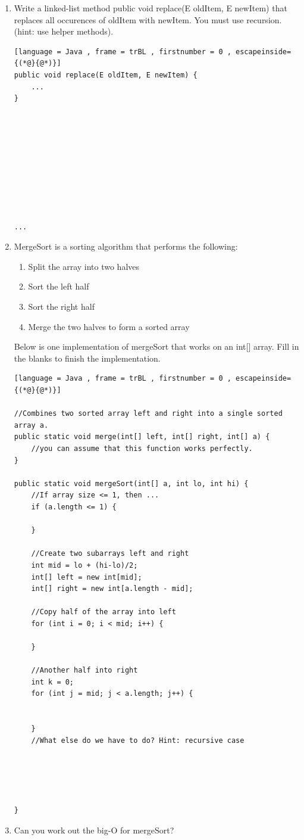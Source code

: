 \documentclass[letter]{article}
\begin{document}
\begin{enumerate}[1.]
    \item Write a linked-list method public void replace(E oldItem, E newItem) that replaces all occurences of oldItem with newItem. You must use recursion. (hint: use helper methods).


\begin{lstlisting}[language = Java , frame = trBL , firstnumber = 0 , escapeinside={(*@}{@*)}]
public void replace(E oldItem, E newItem) {
    ...
}










...
\end{lstlisting}

    \item MergeSort is a sorting algorithm that performs the following:\\

    \begin{enumerate}
        \item Split the array into two halves
        \item Sort the left half
        \item Sort the right half
        \item Merge the two halves to form a sorted array
    \end{enumerate}

    Below is one implementation of mergeSort that works on an int[] array. Fill in the blanks to finish the implementation.
    \begin{lstlisting}[language = Java , frame = trBL , firstnumber = 0 , escapeinside={(*@}{@*)}]

//Combines two sorted array left and right into a single sorted array a.
public static void merge(int[] left, int[] right, int[] a) {
    //you can assume that this function works perfectly. 
}

public static void mergeSort(int[] a, int lo, int hi) {
    //If array size <= 1, then ...
    if (a.length <= 1) {
        
    }

    //Create two subarrays left and right
    int mid = lo + (hi-lo)/2;
    int[] left = new int[mid];
    int[] right = new int[a.length - mid];

    //Copy half of the array into left
    for (int i = 0; i < mid; i++) {
         
    }

    //Another half into right
    int k = 0;
    for (int j = mid; j < a.length; j++) {

        
    }
    //What else do we have to do? Hint: recursive case



    

}
    \end{lstlisting}

    \item Can you work out the big-O for mergeSort?\\

    

\end{enumerate}
\end{document}
